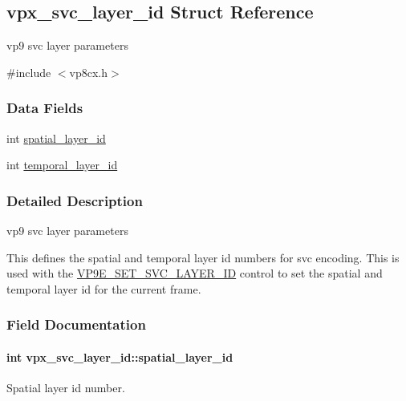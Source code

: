 \hypertarget{structvpx__svc__layer__id}{}\subsection{vpx\+\_\+svc\+\_\+layer\+\_\+id Struct Reference}
\label{structvpx__svc__layer__id}


vp9 svc layer parameters  




{\ttfamily \#include $<$vp8cx.\+h$>$}

\subsubsection*{Data Fields}
\begin{DoxyCompactItemize}
\item 
int \hyperlink{structvpx__svc__layer__id_a91ae13acc06ecde84886601374d4c872}{spatial\+\_\+layer\+\_\+id}
\item 
int \hyperlink{structvpx__svc__layer__id_a365859e15e7a6ff2b06106ea00820ea7}{temporal\+\_\+layer\+\_\+id}
\end{DoxyCompactItemize}


\subsubsection{Detailed Description}
vp9 svc layer parameters 

This defines the spatial and temporal layer id numbers for svc encoding. This is used with the \hyperlink{group__vp8__encoder_gga6deae3d561c838952552c3d3756322eca090ad9dcb1f2eea2af60f4737c5bf514}{V\+P9\+E\+\_\+\+S\+E\+T\+\_\+\+S\+V\+C\+\_\+\+L\+A\+Y\+E\+R\+\_\+\+ID} control to set the spatial and temporal layer id for the current frame. 

\subsubsection{Field Documentation}
\paragraph[{\texorpdfstring{spatial\+\_\+layer\+\_\+id}{spatial_layer_id}}]{\setlength{\rightskip}{0pt plus 5cm}int vpx\+\_\+svc\+\_\+layer\+\_\+id\+::spatial\+\_\+layer\+\_\+id}\hypertarget{structvpx__svc__layer__id_a91ae13acc06ecde84886601374d4c872}{}\label{structvpx__svc__layer__id_a91ae13acc06ecde84886601374d4c872}
Spatial layer id number. 
